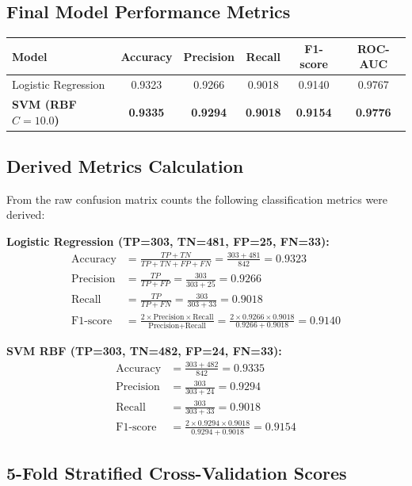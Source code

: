 \documentclass[12pt,a4paper]{article}
\begin{document}
\subsection*{Final Model Performance Metrics}

\begin{tabular}{lccccc}
\toprule
\textbf{Model} & \textbf{Accuracy} & \textbf{Precision} & \textbf{Recall} & \textbf{F1-score} & \textbf{ROC-AUC} \\
\midrule
Logistic Regression & 0.9323 & 0.9266 & 0.9018 & 0.9140 & 0.9767 \\
\textbf{SVM (RBF $C=10.0$)} & \textbf{0.9335} & \textbf{0.9294} & \textbf{0.9018} & \textbf{0.9154} & \textbf{0.9776} \\
\bottomrule
\end{tabular}

\subsection*{Derived Metrics Calculation}

From the raw confusion matrix counts the following classification metrics were derived:

\textbf{Logistic Regression (TP=303, TN=481, FP=25, FN=33):}
\begin{align}
\text{Accuracy} &= \frac{TP + TN}{TP + TN + FP + FN} = \frac{303 + 481}{842} = 0.9323 \\
\text{Precision} &= \frac{TP}{TP + FP} = \frac{303}{303 + 25} = 0.9266 \\
\text{Recall} &= \frac{TP}{TP + FN} = \frac{303}{303 + 33} = 0.9018 \\
\text{F1-score} &= \frac{2 \times \text{Precision} \times \text{Recall}}{\text{Precision} + \text{Recall}} = \frac{2 \times 0.9266 \times 0.9018}{0.9266 + 0.9018} = 0.9140
\end{align}

\textbf{SVM RBF (TP=303, TN=482, FP=24, FN=33):}
\begin{align}
\text{Accuracy} &= \frac{303 + 482}{842} = 0.9335 \\
\text{Precision} &= \frac{303}{303 + 24} = 0.9294 \\
\text{Recall} &= \frac{303}{303 + 33} = 0.9018 \\
\text{F1-score} &= \frac{2 \times 0.9294 \times 0.9018}{0.9294 + 0.9018} = 0.9154
\end{align}

\subsection*{5-Fold Stratified Cross-Validation Scores}
\end{document}
